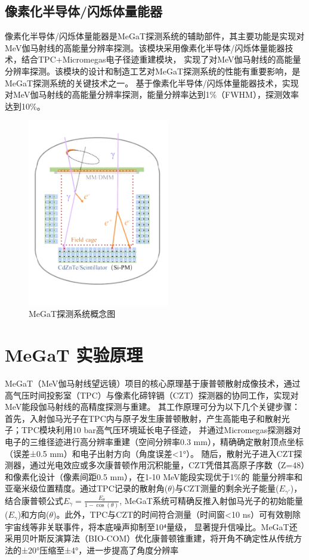 \subsection{像素化半导体/闪烁体量能器}
	像素化半导体/闪烁体量能器是MeGaT探测系统的辅助部件，其主要功能是实现对MeV伽马射线的高能量分辨率探测。该模块采用像素化半导体/闪烁体量能器技术，结合TPC+Micromegas电子径迹重建模块，
	实现了对MeV伽马射线的高能量分辨率探测。该模块的设计和制造工艺对MeGaT探测系统的性能有重要影响，是MeGaT探测系统的关键技术之一。
	基于像素化半导体/闪烁体量能器技术，实现对MeV伽马射线的高能量分辨率探测，能量分辨率达到1\%（FWHM），探测效率达到10\%。
	\begin{figure}
		\centering
		\includegraphics[width=0.55\textwidth]{figures/MeGaT.png}
		\caption{MeGaT探测系统概念图}
	\end{figure}

\section{MeGaT 实验原理}
MeGaT（MeV伽马射线望远镜）项目的核心原理基于康普顿散射成像技术，通过高气压时间投影室（TPC）与像素化碲锌镉（CZT）探测器的协同工作，实现对MeV能段伽马射线的高精度探测与重建。
其工作原理可分为以下几个关键步骤：首先，入射伽马光子在TPC内与原子发生康普顿散射，产生高能电子和散射光子；TPC模块利用10 bar高气压环境延长电子径迹，
并通过Micromegas探测器对电子的三维径迹进行高分辨率重建（空间分辨率0.3 mm），精确确定散射顶点坐标（误差±0.5 mm）和电子出射方向（角度误差<1°）。
随后，散射光子进入CZT探测器，通过光电效应或多次康普顿作用沉积能量，CZT凭借其高原子序数（Z=48）和像素化设计（像素间距0.5 mm），在1-10 MeV能段实现优于1\%的
能量分辨率和亚毫米级位置精度。通过TPC记录的散射角($\theta$)与CZT测量的剩余光子能量($E_{\gamma'}$)，结合康普顿公式$E_{\gamma} = \frac{E_{\theta}}{1-\cos (\theta)}$,
MeGaT系统可精确反推入射伽马光子的初始能量($E_{\gamma}$)和方向($\theta$)。此外，TPC与CZT的时间符合测量（时间窗<10 ns）可有效剔除宇宙线等非关联事件，将本底噪声抑制至10⁴量级，
显著提升信噪比。MeGaT还采用贝叶斯反演算法（BIO-COM）优化康普顿锥重建，将开角不确定性从传统方法的±20°压缩至±4°，进一步提高了角度分辨率

